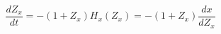\begin{equation}\label{relationx}
\frac{dZ_x}{dt}=-(1+Z_x)H_x(Z_x)=-(1+Z_x)\frac{dx}{dZ_x}
\end{equation}


